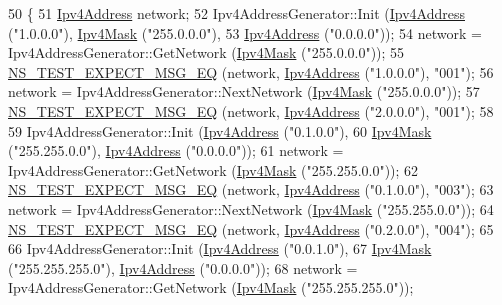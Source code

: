 \begin{DoxyCode}
50 \{
51   \hyperlink{classns3_1_1Ipv4Address}{Ipv4Address} network;
52   Ipv4AddressGenerator::Init (\hyperlink{classns3_1_1Ipv4Address}{Ipv4Address} (\textcolor{stringliteral}{"1.0.0.0"}), \hyperlink{classns3_1_1Ipv4Mask}{Ipv4Mask} (\textcolor{stringliteral}{"255.0.0.0"}),
53                               \hyperlink{classns3_1_1Ipv4Address}{Ipv4Address} (\textcolor{stringliteral}{"0.0.0.0"}));
54   network = Ipv4AddressGenerator::GetNetwork (\hyperlink{classns3_1_1Ipv4Mask}{Ipv4Mask} (\textcolor{stringliteral}{"255.0.0.0"}));
55   \hyperlink{group__testing_ga7304ba46a28d8cf08dfdfd6499cf7068}{NS\_TEST\_EXPECT\_MSG\_EQ} (network, \hyperlink{classns3_1_1Ipv4Address}{Ipv4Address} (\textcolor{stringliteral}{"1.0.0.0"}), \textcolor{stringliteral}{"001"});
56   network = Ipv4AddressGenerator::NextNetwork (\hyperlink{classns3_1_1Ipv4Mask}{Ipv4Mask} (\textcolor{stringliteral}{"255.0.0.0"}));
57   \hyperlink{group__testing_ga7304ba46a28d8cf08dfdfd6499cf7068}{NS\_TEST\_EXPECT\_MSG\_EQ} (network, \hyperlink{classns3_1_1Ipv4Address}{Ipv4Address} (\textcolor{stringliteral}{"2.0.0.0"}), \textcolor{stringliteral}{"001"});
58 
59   Ipv4AddressGenerator::Init (\hyperlink{classns3_1_1Ipv4Address}{Ipv4Address} (\textcolor{stringliteral}{"0.1.0.0"}),
60                               \hyperlink{classns3_1_1Ipv4Mask}{Ipv4Mask} (\textcolor{stringliteral}{"255.255.0.0"}), \hyperlink{classns3_1_1Ipv4Address}{Ipv4Address} (\textcolor{stringliteral}{"0.0.0.0"}));
61   network = Ipv4AddressGenerator::GetNetwork (\hyperlink{classns3_1_1Ipv4Mask}{Ipv4Mask} (\textcolor{stringliteral}{"255.255.0.0"}));
62   \hyperlink{group__testing_ga7304ba46a28d8cf08dfdfd6499cf7068}{NS\_TEST\_EXPECT\_MSG\_EQ} (network, \hyperlink{classns3_1_1Ipv4Address}{Ipv4Address} (\textcolor{stringliteral}{"0.1.0.0"}), \textcolor{stringliteral}{"003"});
63   network = Ipv4AddressGenerator::NextNetwork (\hyperlink{classns3_1_1Ipv4Mask}{Ipv4Mask} (\textcolor{stringliteral}{"255.255.0.0"}));
64   \hyperlink{group__testing_ga7304ba46a28d8cf08dfdfd6499cf7068}{NS\_TEST\_EXPECT\_MSG\_EQ} (network, \hyperlink{classns3_1_1Ipv4Address}{Ipv4Address} (\textcolor{stringliteral}{"0.2.0.0"}), \textcolor{stringliteral}{"004"});
65 
66   Ipv4AddressGenerator::Init (\hyperlink{classns3_1_1Ipv4Address}{Ipv4Address} (\textcolor{stringliteral}{"0.0.1.0"}),
67                               \hyperlink{classns3_1_1Ipv4Mask}{Ipv4Mask} (\textcolor{stringliteral}{"255.255.255.0"}), \hyperlink{classns3_1_1Ipv4Address}{Ipv4Address} (\textcolor{stringliteral}{"0.0.0.0"}));
68   network = Ipv4AddressGenerator::GetNetwork (\hyperlink{classns3_1_1Ipv4Mask}{Ipv4Mask} (\textcolor{stringliteral}{"255.255.255.0"}));

\end{DoxyCode}

